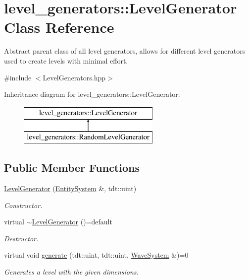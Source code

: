 \hypertarget{classlevel__generators_1_1_level_generator}{}\section{level\+\_\+generators\+:\+:Level\+Generator Class Reference}
\label{classlevel__generators_1_1_level_generator}


Abstract parent class of all level generators, allows for different level generators used to create levels with minimal effort.  




{\ttfamily \#include $<$Level\+Generators.\+hpp$>$}

Inheritance diagram for level\+\_\+generators\+:\+:Level\+Generator\+:\begin{figure}[H]
\begin{center}
\leavevmode
\includegraphics[height=2.000000cm]{classlevel__generators_1_1_level_generator}
\end{center}
\end{figure}
\subsection*{Public Member Functions}
\begin{DoxyCompactItemize}
\item 
\hyperlink{classlevel__generators_1_1_level_generator_a09a0e5fd9fbc3163228139d9b44bdf83}{Level\+Generator} (\hyperlink{class_entity_system}{Entity\+System} \&, tdt\+::uint)
\begin{DoxyCompactList}\small\item\em Constructor. \end{DoxyCompactList}\item 
virtual \hyperlink{classlevel__generators_1_1_level_generator_aba8153552145b2d710b1f6996bdfb997}{$\sim$\+Level\+Generator} ()=default
\begin{DoxyCompactList}\small\item\em Destructor. \end{DoxyCompactList}\item 
virtual void \hyperlink{classlevel__generators_1_1_level_generator_af5c177ea2e5b14b983c47c8c169c5ac7}{generate} (tdt\+::uint, tdt\+::uint, \hyperlink{class_wave_system}{Wave\+System} \&)=0
\begin{DoxyCompactList}\small\item\em Generates a level with the given dimensions. \end{DoxyCompactList}\end{DoxyCompactItemize}
